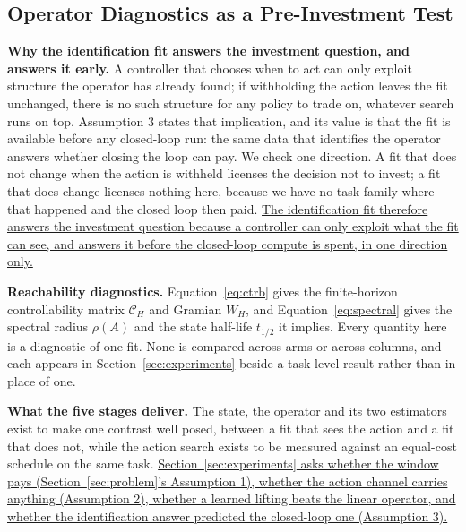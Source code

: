 \subsection{Operator Diagnostics as a Pre-Investment Test}

\textbf{Why the identification fit answers the investment question, and answers it early.}
A controller that chooses when to act can only exploit structure the operator has already
found; if withholding the action leaves the fit unchanged, there is no such structure for any
policy to trade on, whatever search runs on top. Assumption 3 states that implication, and its
value is that the fit is available before any closed-loop run: the same data that identifies
the operator answers whether closing the loop can pay. We check one direction. A fit that does
not change when the action is withheld licenses the decision not to invest; a fit that does
change licenses nothing here, because we have no task family where that happened and the closed
loop then paid.
\uline{The identification fit therefore answers the investment question because a controller
can only exploit what the fit can see, and answers it before the closed-loop compute is spent,
in one direction only.}

\textbf{Reachability diagnostics.} Equation~\eqref{eq:ctrb} gives the finite-horizon
controllability matrix $\mathcal{C}_H$ and Gramian $W_H$, and Equation~\eqref{eq:spectral}
gives the spectral radius $\rho(A)$ and the state half-life $t_{1/2}$ it implies. Every
quantity here is a diagnostic of one fit. None is compared across arms or across columns, and
each appears in Section~\ref{sec:experiments} beside a task-level result rather than in place
of one.

\textbf{What the five stages deliver.} The state, the operator and its two estimators exist to
make one contrast well posed, between a fit that sees the action and a fit that does not, while
the action search exists to be measured against an equal-cost schedule on the same task.
\uline{Section~\ref{sec:experiments} asks whether the window pays (Section~\ref{sec:problem}'s
Assumption 1), whether the action channel carries anything (Assumption 2), whether a learned
lifting beats the linear operator, and whether the identification answer predicted the
closed-loop one (Assumption 3).}

